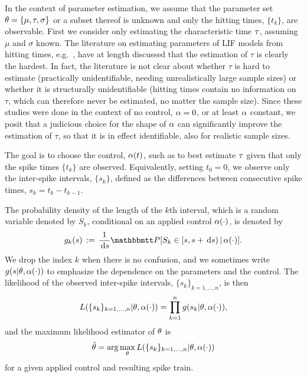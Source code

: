 In the context of parameter estimation, we assume that the
parameter set ${ \theta} = \{{\mu }, { \tau }, \sigma\}$ or a subset thereof is unknown and only the hitting times,
$\{t_k\}$, are observable.
First we consider only estimating the characteristic time ${ \tau }$,
assuming $\mu$ and $\sigma$ known. The literature on estimating parameters of
LIF models from hitting times, e.g.\ \cite{Ditlevsen2007,MullowneyIyengar2008}, have
at length discussed that the estimation of $\tau$ is clearly the
hardest. In fact, the literature is not clear about 
whether $\tau$ is hard to estimate (practically unidentifiable,
needing unrealistically large sample sizes) or
whether it is structurally unidentifiable (hitting times contain no
information on $\tau$, which can therefore never be estimated, no
matter the sample size). Since these studies were done in the
context of no control, $\alpha=0$, or at least $\alpha$ constant, we posit that
a judicious choice for the shape of $\alpha$ can significantly improve the
estimation of $\tau$, so that it is in effect identifiable, also for
realistic sample sizes.

The goal is to choose the control, $\alpha(t)$, such as to best estimate ${ \tau }$
given that only the spike times $\{t_k\}$ are observed. Equivalently, setting
$t_0 = 0$, we observe only the inter-spike intervals, $\{s_k\}$,
defined as the differences between consecutive spike times, $s_k = t_k - t_{k-1}$.

The probability density of the length of the $k$th interval, which is a
random variable denoted by $S_k$, conditional on an applied control $\alpha(\cdot)$,
is denoted by
\begin{equation} 
g_k(s) \, := \,  \frac{1}{\intd{s}} \Prob[S_{k} \in [s, s + \intd{s})  \,|\,
 \a(\cdot)]. 
\label{eq:ISI_distribution_functions}
\end{equation}
We drop the index $k$ when there is no
confusion, and we sometimes write $g(s|{ \theta}, \alpha(\cdot))$ to
emphasize the dependence on the parameters and the control. The
likelihood of the observed inter-spike intervals, $\{s_k\}_{k=1,
  \ldots , n}$, is then
\begin{equation}
L(\{s_k\}_{k=1, \ldots , n} |{ \theta}, \alpha(\cdot)) = \prod_{k=1}^n g(s_k|{ \theta}, \alpha(\cdot)),
\end{equation}
and the maximum likelihood estimator of ${ \theta}$ is
\begin{equation}
\label{MLE}
\hat {{ \theta}} = \arg \max_{{ \theta}} L(\{s_k\}_{k=1, \ldots , n} |{ \theta}, \alpha(\cdot)) 
\end{equation}
for a given applied control and resulting spike train.

